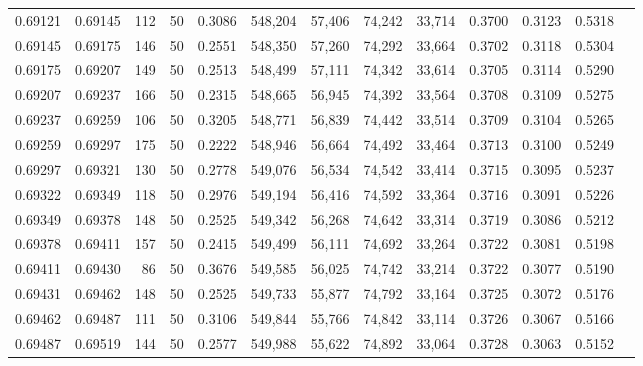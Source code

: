 \begin{tabular}{rrrrrrrrrrrrr}
0.69121 & 0.69145 &   112 &  50 &                                     0.3086 & 548,204 &  57,406 &  74,242 &  33,714 & 0.3700 & 0.3123 & 0.5318 \\
0.69145 & 0.69175 &   146 &  50 &                                     0.2551 & 548,350 &  57,260 &  74,292 &  33,664 & 0.3702 & 0.3118 & 0.5304 \\
0.69175 & 0.69207 &   149 &  50 &                                     0.2513 & 548,499 &  57,111 &  74,342 &  33,614 & 0.3705 & 0.3114 & 0.5290 \\
0.69207 & 0.69237 &   166 &  50 &                                     0.2315 & 548,665 &  56,945 &  74,392 &  33,564 & 0.3708 & 0.3109 & 0.5275 \\
0.69237 & 0.69259 &   106 &  50 &                                     0.3205 & 548,771 &  56,839 &  74,442 &  33,514 & 0.3709 & 0.3104 & 0.5265 \\
0.69259 & 0.69297 &   175 &  50 &                                     0.2222 & 548,946 &  56,664 &  74,492 &  33,464 & 0.3713 & 0.3100 & 0.5249 \\
0.69297 & 0.69321 &   130 &  50 &                                     0.2778 & 549,076 &  56,534 &  74,542 &  33,414 & 0.3715 & 0.3095 & 0.5237 \\
0.69322 & 0.69349 &   118 &  50 &                                     0.2976 & 549,194 &  56,416 &  74,592 &  33,364 & 0.3716 & 0.3091 & 0.5226 \\
0.69349 & 0.69378 &   148 &  50 &                                     0.2525 & 549,342 &  56,268 &  74,642 &  33,314 & 0.3719 & 0.3086 & 0.5212 \\
0.69378 & 0.69411 &   157 &  50 &                                     0.2415 & 549,499 &  56,111 &  74,692 &  33,264 & 0.3722 & 0.3081 & 0.5198 \\
0.69411 & 0.69430 &    86 &  50 &                                     0.3676 & 549,585 &  56,025 &  74,742 &  33,214 & 0.3722 & 0.3077 & 0.5190 \\
0.69431 & 0.69462 &   148 &  50 &                                     0.2525 & 549,733 &  55,877 &  74,792 &  33,164 & 0.3725 & 0.3072 & 0.5176 \\
0.69462 & 0.69487 &   111 &  50 &                                     0.3106 & 549,844 &  55,766 &  74,842 &  33,114 & 0.3726 & 0.3067 & 0.5166 \\
0.69487 & 0.69519 &   144 &  50 &                                     0.2577 & 549,988 &  55,622 &  74,892 &  33,064 & 0.3728 & 0.3063 & 0.5152 \\

\end{tabular}

